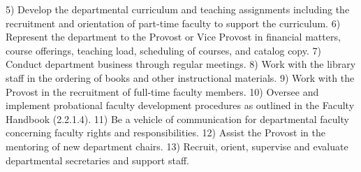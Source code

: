 \documentclass[letterpaper, 11pt]{article}
\begin{document}
5) Develop the departmental curriculum and teaching assignments including the recruitment and orientation of part-time faculty to support the curriculum.
6) Represent the department to the Provost or Vice Provost in financial matters, course offerings, teaching load, scheduling of courses, and catalog copy.
7) Conduct department business through regular meetings.
8) Work with the library staff in the ordering of books and other instructional materials.
9) Work with the Provost in the recruitment of full-time faculty members.
10) Oversee and implement probational faculty development procedures as outlined in the Faculty Handbook (2.2.1.4).
11) Be a vehicle of communication for departmental faculty concerning faculty rights and responsibilities.
12) Assist the Provost in the mentoring of new department chairs.
13) Recruit, orient, supervise and evaluate departmental secretaries and support staff.
\end{document}
